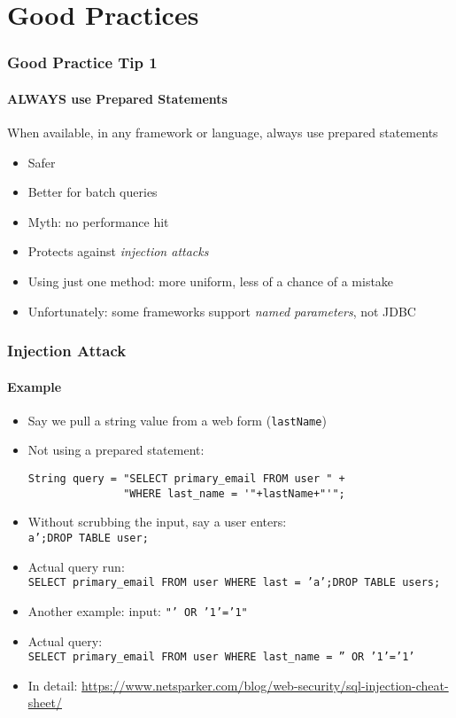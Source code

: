 \documentclass{beamer}
\begin{document}
\section{Good Practices}

\begin{frame}[fragile]
  \frametitle{Good Practice Tip 1}
  \framesubtitle{ALWAYS use Prepared Statements}

When available, in any framework or language, always use prepared statements

\begin{itemize}
  \item Safer
  \item Better for batch queries
  \item Myth: no performance hit
  \item Protects against \emph{injection attacks}
  \item Using just one method: more uniform, less of a chance of a mistake
  \item Unfortunately: some frameworks support \emph{named parameters}, not JDBC
\end{itemize}

\end{frame}

\begin{frame}[fragile]
  \frametitle{Injection Attack}
  \framesubtitle{Example}

\begin{itemize}
  \item Say we pull a string value from a web form (\texttt{lastName})
  \item Not using a prepared statement:\\
\begin{verbatim}
String query = "SELECT primary_email FROM user " + 
               "WHERE last_name = '"+lastName+"'";
\end{verbatim}               
  \item Without scrubbing the input, say a user enters:\\
	\texttt{a';DROP TABLE user;}
  \item Actual query run:\\
	\texttt{SELECT primary_email FROM user WHERE last = 'a';DROP TABLE users;}
  \item Another example: input: \texttt{"' OR '1'='1"}
  \item Actual query:\\
	\texttt{SELECT primary_email FROM user WHERE last_name = '' OR '1'='1'}
  \item In detail: \url{https://www.netsparker.com/blog/web-security/sql-injection-cheat-sheet/}	
\end{itemize}

\end{frame}
\end{document}

